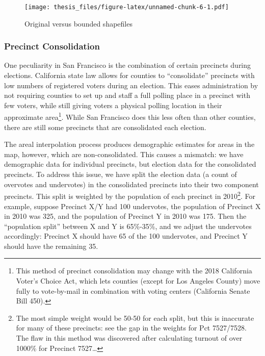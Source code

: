 \documentclass[12pt,twoside]{reedthesis}
\theoremstyle{definition}
\theoremstyle{definition}
\theoremstyle{definition}
\theoremstyle{remark}
\begin{document}
\begin{figure}
\centering
\texttt{[image: thesis\_files/figure-latex/unnamed-chunk-6-1.pdf]}
\caption{\label{fig:unnamed-chunk-6}Original versus bounded shapefiles}
\end{figure}
\hypertarget{precinct-consolidation}{%
\subsubsection{Precinct Consolidation}\label{precinct-consolidation}}

One peculiarity in San Francisco is the combination of certain precincts
during elections. California state law allows for counties to
``consolidate'' precincts with low numbers of registered voters during
an election. This eases administration by not requiring counties to set
up and staff a full polling place in a precinct with few voters, while
still giving voters a physical polling location in their approximate
area\footnote{This method of precinct consolidation may change with the
  2018 California Voter's Choice Act, which lets counties (except for
  Los Angeles County) move fully to vote-by-mail in combination with
  voting centers (California Senate Bill 450).}. While San Francisco
does this less often than other counties, there are still some precincts
that are consolidated each election.

The areal interpolation process produces demographic estimates for areas
in the map, however, which are non-consolidated. This causes a mismatch:
we have demographic data for individual precincts, but election data for
the consolidated precincts. To address this issue, we have split the
election data (a count of overvotes and undervotes) in the consolidated
precincts into their two component precincts. This split is weighted by
the population of each precinct in 2010\footnote{The most simple weight
  would be 50-50 for each split, but this is inaccurate for many of
  these precincts: see the gap in the weights for Pct 7527/7528. The
  flaw in this method was discovered after calculating turnout of over
  1000\% for Precinct 7527\ldots{}}. For example, suppose Precinct X/Y
had 100 undervotes, the population of Precinct X in 2010 was 325, and
the population of Precinct Y in 2010 was 175. Then the ``population
split'' between X and Y is 65\%-35\%, and we adjust the undervotes
accordingly: Precinct X should have 65 of the 100 undervotes, and
Precinct Y should have the remaining 35.
\end{document}
